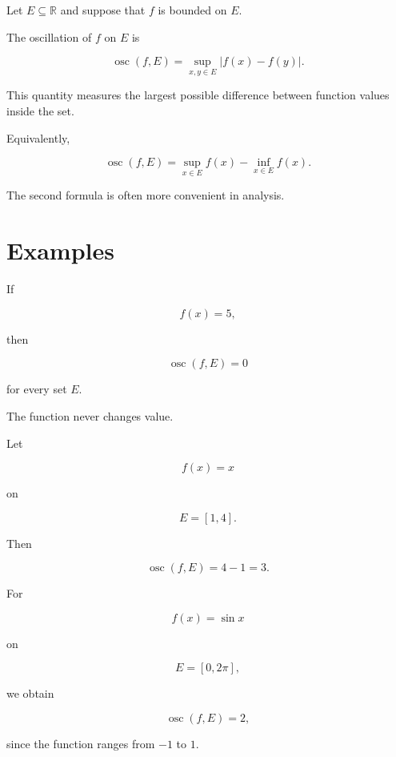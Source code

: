 \documentclass{essay}
\begin{document}
\begin{definition}

  Let \(E\subseteq\mathbb{R}\) and suppose that \(f\) is bounded on \(E\).

  The oscillation of \(f\) on \(E\) is

  \[ \operatorname{osc}(f,E) = \sup_{x,y\in E}|f(x)-f(y)|. \]

\end{definition}

This quantity measures the largest possible difference between function values
inside the set.

Equivalently,

\[ \operatorname{osc}(f,E) = \sup_{x\in E}f(x) - \inf_{x\in E}f(x). \]

The second formula is often more convenient in analysis.


\section{Examples}

\begin{example}

  If

  \[ f(x)=5, \]

  then

  \[ \operatorname{osc}(f,E)=0 \]

  for every set \(E\).

  The function never changes value.

\end{example}

\begin{example}

  Let

  \[ f(x)=x \]

  on

  \[ E=[1,4]. \]

  Then

  \[ \operatorname{osc}(f,E)=4-1=3. \]

\end{example}

\begin{example}

  For

  \[ f(x)=\sin x \]

  on

  \[ E=[0,2\pi], \]

  we obtain

  \[ \operatorname{osc}(f,E)=2, \]

  since the function ranges from \(-1\) to \(1\).

\end{example}
\end{document}
